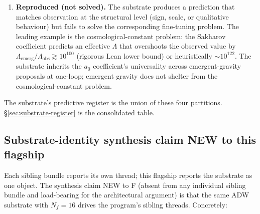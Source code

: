 \documentclass[aps,prd,reprint,nofootinbib,superscriptaddress]{revtex4-2}
\begin{document}
\begin{enumerate}
\item \textbf{Reproduced (not solved).} The substrate produces a
  prediction that matches observation at the structural level (sign,
  scale, or qualitative behaviour) but fails to solve the corresponding
  fine-tuning problem. The leading example is the cosmological-constant
  problem: the Sakharov coefficient predicts an effective $\Lambda$
  that overshoots the observed value by
  $\Lambda_{\mathrm{emerg}}/\Lambda_{\mathrm{obs}} \gtrsim 10^{100}$
  (rigorous Lean lower bound) or heuristically $\sim 10^{122}$. The
  substrate inherits the $a_0$ coefficient's universality across
  emergent-gravity proposals at one-loop; emergent gravity does not
  shelter from the cosmological-constant problem.
\end{enumerate}

The substrate's predictive register is the union of these four
partitions. \S\ref{sec:substrate-register} is the consolidated table.

\subsection{Substrate-identity synthesis claim NEW to this flagship}
\label{sec:synthesis-claim}

Each sibling bundle reports its own thread; this flagship reports the
substrate as one object. The synthesis claim NEW to F (absent from any
individual sibling bundle and load-bearing for the architectural
argument) is that the same ADW substrate with $N_f = 16$ drives the
program's sibling threads. Concretely:
\end{document}

